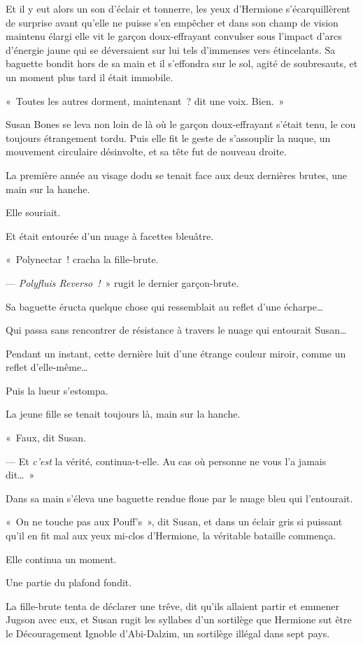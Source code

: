 Et il y eut alors un son d'éclair et tonnerre, les yeux d'Hermione s'écarquillèrent de surprise avant qu'elle ne puisse s'en empêcher et dans son champ de vision maintenu élargi elle vit le garçon doux-effrayant convulser sous l'impact d'arcs d'énergie jaune qui se déversaient sur lui tels d'immenses vers étincelants. Sa baguette bondit hors de sa main et il s'effondra sur le sol, agité de soubresauts, et un moment plus tard il était immobile.

«~Toutes les autres dorment, maintenant~? dit une voix. Bien.~»

Susan Bones se leva non loin de là où le garçon doux-effrayant s'était tenu, le cou toujours étrangement tordu. Puis elle fit le geste de s'assouplir la nuque, un mouvement circulaire désinvolte, et sa tête fut de nouveau droite.

La première année au visage dodu se tenait face aux deux dernières brutes, une main sur la hanche.

Elle souriait.

Et était entourée d'un nuage à facettes bleuâtre.

«~Polynectar~! cracha la fille-brute.

--- \emph{Polyfluis Reverso~!}~» rugit le dernier garçon-brute.

Sa baguette éructa quelque chose qui ressemblait au reflet d'une écharpe…

Qui passa sans rencontrer de résistance à travers le nuage qui entourait Susan…

Pendant un instant, cette dernière luit d'une étrange couleur miroir, comme un reflet d'elle-même…

Puis la lueur s'estompa.

La jeune fille se tenait toujours là, main sur la hanche.

«~Faux, dit Susan.

--- Et \emph{c'est} la vérité, continua-t-elle. Au cas où personne ne vous l'a jamais dit…~»

Dans sa main s'éleva une baguette rendue floue par le nuage bleu qui l'entourait.

«~On ne touche pas aux Pouff's~», dit Susan, et dans un éclair gris si puissant qu'il en fit mal aux yeux mi-clos d'Hermione, la véritable bataille commença.

Elle continua un moment.

Une partie du plafond fondit.

La fille-brute tenta de déclarer une trêve, dit qu'ils allaient partir et emmener Jugson avec eux, et Susan rugit les syllabes d'un sortilège que Hermione sut être le Découragement Ignoble d'Abi-Dalzim, un sortilège illégal dans sept pays.

